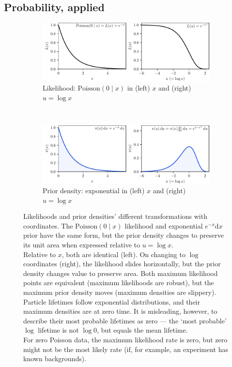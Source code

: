 \subsection{Probability, applied}
\begin{figure}[tp]
\centering
\begin{subfigure}{\textwidth}
\centering
\includegraphics[width=\textwidth]{figures/searches_abacus_likelihood.pdf}
\caption{%
Likelihood: $\mathrm{Poisson}(0\mid x)$ in
(left) $x$ and
(right) $u = \log x$%
}
\end{subfigure}
\\[.5em]
\begin{subfigure}{\textwidth}
\centering
\includegraphics[width=\textwidth]{figures/searches_abacus_prior.pdf}
\caption{%
Prior density: exponential in
(left) $x$ and
(right) $u = \log x$%
}
\end{subfigure}
\caption[
Likelihoods and prior densities' different transformations
]{%
Likelihoods and prior densities' different transformations with coordinates.
The $\mathrm{Poisson}(0\mid x)$ likelihood and exponential $e^{-x}\mathrm{d}x$
prior have the same form, but the prior density changes to preserve its unit
area when expressed relative to $u = \log x$.
\\[.5em]
Relative to $x$, both are identical (left).
On changing to $\log$ coordinates (right), the likelihood slides horizontally,
but the prior density changes value to preserve area.
Both maximum likelihood points are equivalent (maximum likelihoods are robust),
but the maximum prior density moves (maximum densities are slippery).
\\[.5em]
Particle lifetimes follow exponential distributions, and their maximum
densities are at zero time.
It is misleading, however, to describe their most probable lifetimes as zero
---
the `most probable' $\log$ lifetime is not $\log 0$, but equals the mean
lifetime.
\\[.5em]
For zero Poisson data, the maximum likelihood rate is zero, but zero might not
be the most likely rate (if, for example, an experiment has known backgrounds).
}
\label{fig:searches_abacus}
\end{figure}
